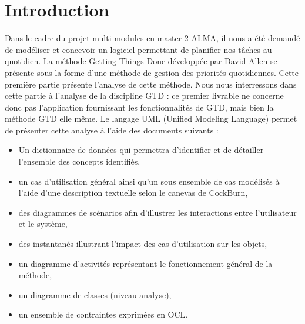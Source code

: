 \chapter{Introduction}


Dans le cadre du projet multi-modules en master 2 ALMA, il nous a été demandé de modéliser et concevoir un logiciel permettant de planifier nos tâches au quotidien.
La méthode Getting Things Done développée par David Allen se présente sous la forme d'une méthode de gestion des priorités quotidiennes. Cette première partie présente l'analyse de cette méthode. Nous nous interressons dans cette partie à l'analyse de la discipline GTD : ce premier livrable ne concerne donc pas l'application fournissant les fonctionnalités de GTD, mais bien la méthode GTD elle même. Le langage UML (Unified Modeling Language) permet de présenter cette analyse à l'aide des documents suivants :\\

\begin{itemize}


\item Un dictionnaire de données qui permettra d'identifier et de détailler l'ensemble des concepts identifiés,
\item un cas d'utilisation général ainsi qu'un sous ensemble de cas modélisés à l'aide d'une description textuelle selon le canevas de CockBurn,
\item des diagrammes de scénarios afin d'illustrer les interactions entre l'utilisateur et le système,
\item des instantanés illustrant l'impact des cas d'utilisation sur les objets,
\item un diagramme d'activités représentant le fonctionnement général de la méthode,
\item un diagramme de classes (niveau analyse),
\item un ensemble de contraintes exprimées en OCL.

\end{itemize}


